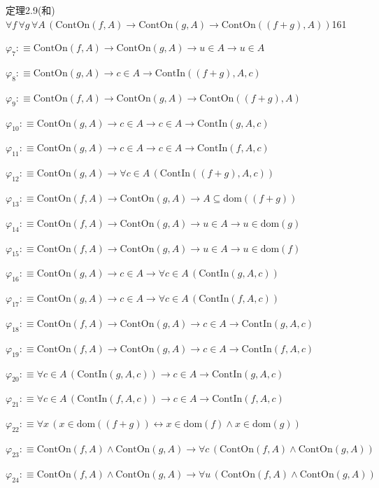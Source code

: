 \begin{fullproof}{定理2.9(和)}{$\forall f\,\forall g\,\forall A\,(\mathrm{ContOn}(f,A) \to \mathrm{ContOn}(g,A) \to \mathrm{ContOn}((f + g),A))$}{161}
\begin{abbrevlist}
\item $\varphi_{7} :\equiv \mathrm{ContOn}(f,A) \to \mathrm{ContOn}(g,A) \to u \in A \to u \in A$
\item $\varphi_{8} :\equiv \mathrm{ContOn}(g,A) \to c \in A \to \mathrm{ContIn}((f + g),A,c)$
\item $\varphi_{9} :\equiv \mathrm{ContOn}(f,A) \to \mathrm{ContOn}(g,A) \to \mathrm{ContOn}((f + g),A)$
\item $\varphi_{10} :\equiv \mathrm{ContOn}(g,A) \to c \in A \to c \in A \to \mathrm{ContIn}(g,A,c)$
\item $\varphi_{11} :\equiv \mathrm{ContOn}(g,A) \to c \in A \to c \in A \to \mathrm{ContIn}(f,A,c)$
\item $\varphi_{12} :\equiv \mathrm{ContOn}(g,A) \to \forall c \in A\,(\mathrm{ContIn}((f + g),A,c))$
\item $\varphi_{13} :\equiv \mathrm{ContOn}(f,A) \to \mathrm{ContOn}(g,A) \to A \subseteq \mathrm{dom}((f + g))$
\item $\varphi_{14} :\equiv \mathrm{ContOn}(f,A) \to \mathrm{ContOn}(g,A) \to u \in A \to u \in \mathrm{dom}(g)$
\item $\varphi_{15} :\equiv \mathrm{ContOn}(f,A) \to \mathrm{ContOn}(g,A) \to u \in A \to u \in \mathrm{dom}(f)$
\item $\varphi_{16} :\equiv \mathrm{ContOn}(g,A) \to c \in A \to \forall c \in A\,(\mathrm{ContIn}(g,A,c))$
\item $\varphi_{17} :\equiv \mathrm{ContOn}(g,A) \to c \in A \to \forall c \in A\,(\mathrm{ContIn}(f,A,c))$
\item $\varphi_{18} :\equiv \mathrm{ContOn}(f,A) \to \mathrm{ContOn}(g,A) \to c \in A \to \mathrm{ContIn}(g,A,c)$
\item $\varphi_{19} :\equiv \mathrm{ContOn}(f,A) \to \mathrm{ContOn}(g,A) \to c \in A \to \mathrm{ContIn}(f,A,c)$
\item $\varphi_{20} :\equiv \forall c \in A\,(\mathrm{ContIn}(g,A,c)) \to c \in A \to \mathrm{ContIn}(g,A,c)$
\item $\varphi_{21} :\equiv \forall c \in A\,(\mathrm{ContIn}(f,A,c)) \to c \in A \to \mathrm{ContIn}(f,A,c)$
\item $\varphi_{22} :\equiv \forall x\,(x \in \mathrm{dom}((f + g)) \leftrightarrow x \in \mathrm{dom}(f) \land x \in \mathrm{dom}(g))$
\item $\varphi_{23} :\equiv \mathrm{ContOn}(f,A) \land \mathrm{ContOn}(g,A) \to \forall c\,(\mathrm{ContOn}(f,A) \land \mathrm{ContOn}(g,A))$
\item $\varphi_{24} :\equiv \mathrm{ContOn}(f,A) \land \mathrm{ContOn}(g,A) \to \forall u\,(\mathrm{ContOn}(f,A) \land \mathrm{ContOn}(g,A))$

\end{abbrevlist}
\end{fullproof}
